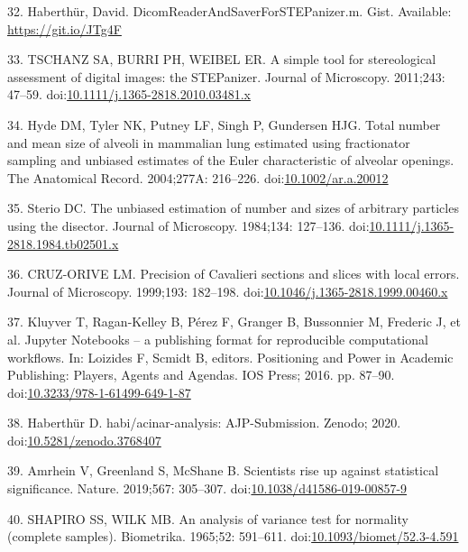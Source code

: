 \documentclass[
  american,
]{article}
\newenvironment{cslreferences}%
  {}%
  {\par}
\begin{document}
\begin{cslreferences}
\leavevmode\hypertarget{ref-12Z2YPzm8}{}%
32. Haberthür, David. DicomReaderAndSaverForSTEPanizer.m. Gist. Available: \url{https://git.io/JTg4F}

\leavevmode\hypertarget{ref-nPoQ2EIB}{}%
33. TSCHANZ SA, BURRI PH, WEIBEL ER. A simple tool for stereological assessment of digital images: the STEPanizer. Journal of Microscopy. 2011;243: 47--59. doi:\href{https://doi.org/10.1111/j.1365-2818.2010.03481.x}{10.1111/j.1365-2818.2010.03481.x}

\leavevmode\hypertarget{ref-QiAxY2i3}{}%
34. Hyde DM, Tyler NK, Putney LF, Singh P, Gundersen HJG. Total number and mean size of alveoli in mammalian lung estimated using fractionator sampling and unbiased estimates of the Euler characteristic of alveolar openings. The Anatomical Record. 2004;277A: 216--226. doi:\href{https://doi.org/10.1002/ar.a.20012}{10.1002/ar.a.20012}

\leavevmode\hypertarget{ref-FJ9FoB4m}{}%
35. Sterio DC. The unbiased estimation of number and sizes of arbitrary particles using the disector. Journal of Microscopy. 1984;134: 127--136. doi:\href{https://doi.org/10.1111/j.1365-2818.1984.tb02501.x}{10.1111/j.1365-2818.1984.tb02501.x}

\leavevmode\hypertarget{ref-FE9HLB4f}{}%
36. CRUZ-ORIVE LM. Precision of Cavalieri sections and slices with local errors. Journal of Microscopy. 1999;193: 182--198. doi:\href{https://doi.org/10.1046/j.1365-2818.1999.00460.x}{10.1046/j.1365-2818.1999.00460.x}

\leavevmode\hypertarget{ref-pQ6Wbz73}{}%
37. Kluyver T, Ragan-Kelley B, Pérez F, Granger B, Bussonnier M, Frederic J, et al. Jupyter Notebooks -- a publishing format for reproducible computational workflows. In: Loizides F, Scmidt B, editors. Positioning and Power in Academic Publishing: Players, Agents and Agendas. IOS Press; 2016. pp. 87--90. doi:\href{https://doi.org/10.3233/978-1-61499-649-1-87}{10.3233/978-1-61499-649-1-87}

\leavevmode\hypertarget{ref-V87xbt0b}{}%
38. Haberthür D. habi/acinar-analysis: AJP-Submission. Zenodo; 2020. doi:\href{https://doi.org/10.5281/zenodo.3768407}{10.5281/zenodo.3768407}

\leavevmode\hypertarget{ref-o21zxPIu}{}%
39. Amrhein V, Greenland S, McShane B. Scientists rise up against statistical significance. Nature. 2019;567: 305--307. doi:\href{https://doi.org/10.1038/d41586-019-00857-9}{10.1038/d41586-019-00857-9}

\leavevmode\hypertarget{ref-IkHrgIj3}{}%
40. SHAPIRO SS, WILK MB. An analysis of variance test for normality (complete samples). Biometrika. 1965;52: 591--611. doi:\href{https://doi.org/10.1093/biomet/52.3-4.591}{10.1093/biomet/52.3-4.591}


\end{cslreferences}
\end{document}
